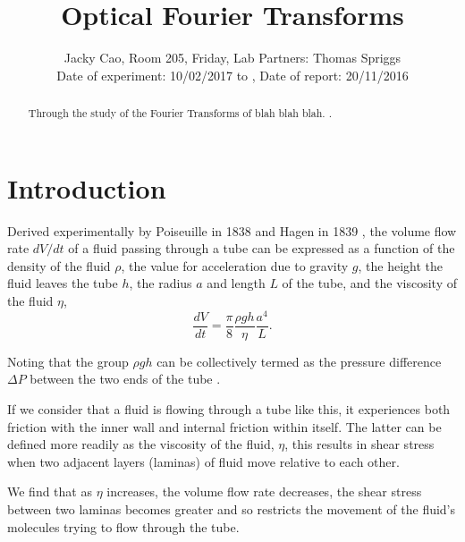 \documentclass[twocolumn]{revtex4}
\newcommand{\squeezeup}{\vspace{-2.5mm}}
\begin{document}
\textheight=26.385cm

\title{Optical Fourier Transforms} 
 
 
\author{Jacky Cao, Room 205, Friday, Lab Partners: Thomas Spriggs \\ Date of experiment: 10/02/2017 to , Date of report: 20/11/2016}


\begin{abstract}              
Through the study of the Fourier Transforms of blah blah blah. \cite{crc}. 
\squeezeup
\squeezeup
\squeezeup
\end{abstract}

\maketitle

\squeezeup
\squeezeup

\section{Introduction} 
\vspace{-2ex} 
Derived experimentally by Poiseuille in 1838 and Hagen in 1839 \cite{poiseuillehagen}, the volume flow rate $dV/dt$ of a fluid passing through a tube can be expressed as a function of the density of the fluid $\rho$, the value for acceleration due to gravity $g$, the height the fluid leaves the tube $h$, the radius $a$ and length $L$ of the tube, and the viscosity of the fluid $\eta$,
\squeezeup
\begin{equation} 
\frac{dV}{dt}=\frac{\pi}{8}\frac{\rho gh}{\eta}\frac{a^4}{L}. 
\label{pohagen}
\end{equation}

Noting that the group $\rho gh$ can be collectively termed as the pressure difference $\Delta P$ between the two ends of the tube \cite{collegephysics}. 

If we consider that a fluid is flowing through a tube like this, it experiences both friction with the inner wall and internal friction within itself. The latter can be defined more readily as the viscosity of the fluid, $\eta$, this results in shear stress when two adjacent layers (laminas) of fluid move relative to each other. 

We find that as $\eta$ increases, the volume flow rate decreases, the shear stress between two laminas becomes greater and so restricts the movement of the fluid's molecules trying to flow through the tube. 
\end{document}
